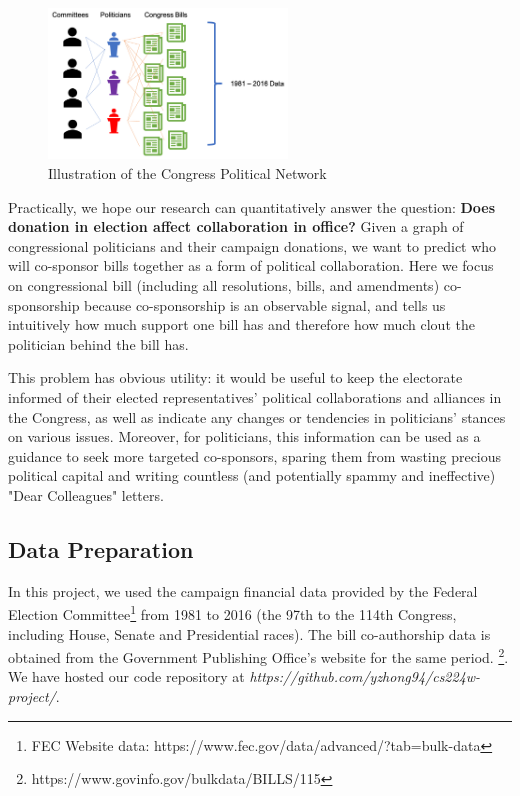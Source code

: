 \documentclass[12pt,twocolumn]{article}
\begin{document}
\begin{figure}[!t]
\centering
\includegraphics[width=2.5in]{network_illustration2}
\caption{Illustration of the Congress Political Network}
\label{fig_sim}
\end{figure}

Practically, we hope our research can quantitatively answer the question: \textbf{Does donation in election affect collaboration in office?} Given a graph of congressional politicians and their campaign donations, we want to predict who will co-sponsor bills together as a form of political collaboration. Here we focus on congressional bill (including all resolutions, bills, and amendments) co-sponsorship because co-sponsorship is an observable signal, and tells us intuitively how much support one bill has and therefore how much clout the politician behind the bill has. 

This problem has obvious utility: it would be useful to keep the electorate informed of their elected representatives' political collaborations and alliances in the Congress, as well as indicate any changes or tendencies in politicians' stances on various issues. Moreover, for politicians, this information can be used as a guidance to seek more targeted co-sponsors, sparing them from wasting precious political capital and writing countless (and potentially spammy and ineffective) "Dear Colleagues" letters. 

\subsection{Data Preparation}
In this project, we used the campaign financial data provided by the Federal Election Committee\footnote{FEC Website data: https://www.fec.gov/data/advanced/?tab=bulk-data } from 1981 to 2016 (the 97th to the 114th Congress, including House, Senate and Presidential races). The bill co-authorship data is obtained from the Government Publishing Office's website for the same period. \footnote{https://www.govinfo.gov/bulkdata/BILLS/115}.  We have hosted our code repository at \textit{https://github.com/yzhong94/cs224w-project/}. 
\end{document}

